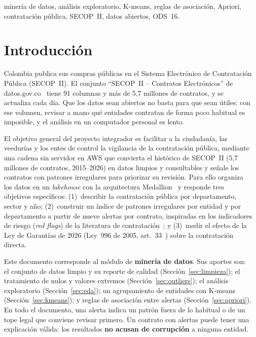 \documentclass[conference,a4paper]{IEEEtran}
\begin{document}
\begin{IEEEkeywords}
minería de datos, análisis exploratorio, K-means, reglas de asociación, Apriori, contratación pública, SECOP~II,
datos abiertos, ODS~16.
\end{IEEEkeywords}

\section{Introducción}
Colombia publica sus compras públicas en el Sistema Electrónico de Contratación Pública (SECOP~II). El
conjunto ``SECOP~II -- Contratos Electrónicos'' de datos.gov.co~\cite{secop} tiene 91 columnas y más de 5,7
millones de contratos, y se actualiza cada día. Que los datos sean abiertos no basta para que sean útiles: con
ese volumen, revisar a mano qué entidades contratan de forma poco habitual es imposible, y el análisis en un
computador personal es lento.

El objetivo general del proyecto integrador es facilitar a la ciudadanía, las veedurías y los entes de control
la vigilancia de la contratación pública, mediante una cadena sin servidor en AWS que convierta el histórico de SECOP~II (5,7 millones de contratos, 2015--2026) en datos limpios y consultables y señale los contratos con patrones irregulares para priorizar su revisión. Para ello organiza los datos en un \emph{lakehouse} con la arquitectura
Medallion~\cite{medallion,lakehouse} y responde tres objetivos específicos: (1)~describir la contratación pública por
departamento, sector y año; (2)~construir un índice de patrones irregulares por entidad y por departamento a
partir de nueve alertas por contrato, inspiradas en los indicadores de riesgo (\emph{red flags}) de la
literatura de contratación~\cite{ocp,fazekas}; y (3)~medir el efecto de la Ley de Garantías de 2026 (Ley~996 de
2005, art.~33~\cite{ley996}) sobre la contratación directa.

Este documento corresponde al módulo de \textbf{minería de datos}. Sus aportes son: el conjunto de datos limpio
y su reporte de calidad (Sección~\ref{sec:limpieza}); el tratamiento de nulos y valores extremos
(Sección~\ref{sec:outliers}); el análisis exploratorio (Sección~\ref{sec:eda}); un agrupamiento de entidades con
K-means (Sección~\ref{sec:kmeans}); y reglas de asociación entre alertas (Sección~\ref{sec:apriori}). En todo el
documento, una alerta indica un patrón fuera de lo habitual o de un tope legal que conviene revisar primero. Un
contrato con alertas puede tener una explicación válida: los resultados \textbf{no acusan de corrupción} a
ninguna entidad.
\end{document}
